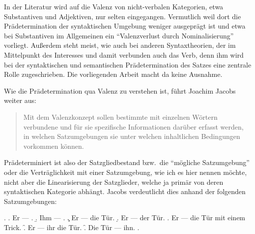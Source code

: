 In der Literatur wird auf die Valenz von nicht-verbalen Kategorien, etwa Substantiven und Adjektiven, nur selten eingegangen. Vermutlich weil dort die Prädetermination der syntaktischen Umgebung weniger ausgeprägt ist und etwa bei Substantiven im Allgemeinen ein "`Valenzverlust durch Nominalisierung"' \citep[61]{Agel:00} vorliegt. Außerdem steht meist, wie auch bei anderen Syntaxtheorien, der  im Mittelpunkt des Interesses und damit verbunden auch das Verb, denn ihm wird bei der syntaktischen und semantischen Prädetermination des Satzes eine zentrale Rolle zugeschrieben. Die vorliegenden Arbeit macht da keine Ausnahme.

Wie die Prädetermination qua Valenz zu verstehen ist, führt Joachim Jacobs weiter aus:
\begin{quote}
Mit dem Valenzkonzept sollen bestimmte mit einzelnen Wörtern verbundene und für sie spezifische Informationen darüber erfasst werden, in welchen Satzumgebungen sie unter welchen inhaltlichen Bedingungen vorkommen können. \citep[378]{Jacobs:03}
\end{quote}
Prädeterminiert ist also der Satzgliedbestand bzw.\ die "`mögliche Satzumgebung"' oder die Verträglichkeit mit einer Satzumgebung, wie ich es hier nennen möchte, nicht aber die Linearisierung der Satzglieder, welche ja primär von deren syntaktischen Kategorie abhängt. Jacobs verdeutlicht dies anhand der folgenden Satzumgebungen:

\ex. \label{ex-valenz-1}
\a. \label{ex-valenz-1-a} Er --- .
\b. \label{ex-valenz-1-b} Ihm --- .
\c. \label{ex-valenz-1-c} Er --- die Tür.
\d. \label{ex-valenz-1-d} Er --- der Tür.
\e. \label{ex-valenz-1-e} Er --- die Tür mit einem Trick.
\f. \label{ex-valenz-1-f} Er --- ihr die Tür.
\f. \label{ex-valenz-1-g} Die Tür --- ihn.
\z. \citep[(1)]{Jacobs:03}  

